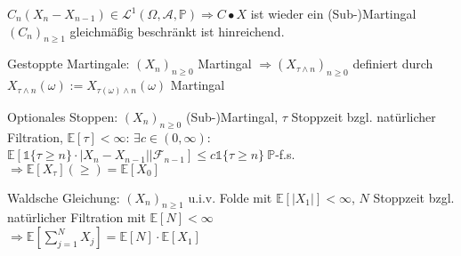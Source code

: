 \documentclass[a4paper,draft]{article}
\newcommand{\one}{\mathds{1}}
\newcommand{\A}{\mathcal{A}}
\renewcommand{\P}{\mathds{P}}
\newcommand{\E}[1]{\mathds{E}[#1]}
\newcommand{\F}{\mathcal{F}}
\newcommand{\cE}[2]{\E{#1 | #2}}
\newcommand{\parh}{\par\hangindent=0.5cm}
\renewcommand{\wr}{(\Omega,\A,\P)}
\begin{document}
\begin{multicols}{2}
$C_n(X_n-X_{n-1})\in\mathcal{L}^1\wr \Longrightarrow C\bullet X$ ist wieder ein (Sub-)Martingal\\
$(C_n)_{n\geq 1}$ gleichmäßig beschränkt ist hinreichend.\parh
Gestoppte Martingale: $(X_n)_{n\geq 0}$ Martingal $\Longrightarrow (X_{\tau \wedge n})_{n\geq 0}$ definiert durch $X_{\tau \wedge n}(\omega):=X_{\tau(\omega)\wedge n}(\omega)$ Martingal\parh
Optionales Stoppen: $(X_n)_{n\geq 0}$ (Sub-)Martingal, $\tau$ Stoppzeit bzgl. natürlicher Filtration, $\E{\tau}<\infty$: $\exists c\in(0,\infty)$:\\
$\cE{\one\{\tau\geq n\}\cdot|X_n-X_{n-1}|}{\F_{n-1}}\leq c\one\{\tau\geq n\} \:\P$-f.s.\\
$\Longrightarrow  \E{X_\tau}(\geq)=\E{X_0}$\parh
Waldsche Gleichung: $(X_n)_{n\geq 1}$ u.i.v. Folde mit $\E{|X_1|}<\infty$, $N$ Stoppzeit bzgl. natürlicher Filtration mit $\E{N}<\infty$\\
$\Longrightarrow \E{\sum_{j=1}^N X_j}=\E{N}\cdot\E{X_1}$

\end{multicols}
\end{document}

